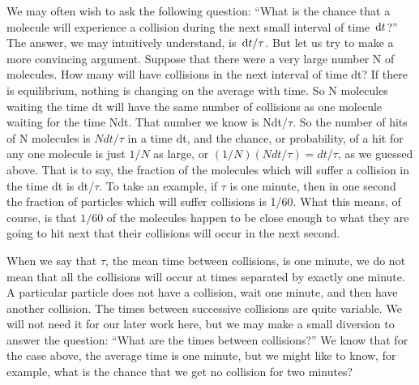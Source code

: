 \begin{subappendices}
We may often wish to ask the following question: ``What is the chance that a molecule will experience a collision during the next small interval of time $\,\mathrm{d} t$?'' The answer, we may intuitively understand, is $\,\mathrm{d} t/\tau$. But let us try to make a more convincing argument. Suppose that there were a very large number N of molecules. How many will have collisions in the next interval of time dt? If there is equilibrium, nothing is changing on the average with time. So N molecules waiting the time dt will have the same number of collisions as one molecule waiting for the time Ndt. That number we know is Ndt/$\tau$. So the number of hits of N molecules is $Ndt/\tau$ in a time dt, and the chance, or probability, of a hit for any one molecule is just $1/N$ as large, or $(1/N)(Ndt/\tau)=dt/\tau$, as we guessed above. That is to say, the fraction of the molecules which will suffer a collision in the time dt is dt/$\tau$. To take an example, if $\tau$ is one minute, then in one second the fraction of particles which will suffer collisions is 1/60. What this means, of course, is that $1/60$ of the molecules happen to be close enough to what they are going to hit next that their collisions will occur in the next second.

When we say that $\tau$, the mean time between collisions, is one minute, we do not mean that all the collisions will occur at times separated by exactly one minute. A particular particle does not have a collision, wait one minute, and then have another collision. The times between successive collisions are quite variable. We will not need it for our later work here, but we may make a small diversion to answer the question: ``What are the times between collisions?'' We know that for the case above, the average time is one minute, but we might like to know, for example, what is the chance that we get no collision for two minutes?


\end{subappendices}
